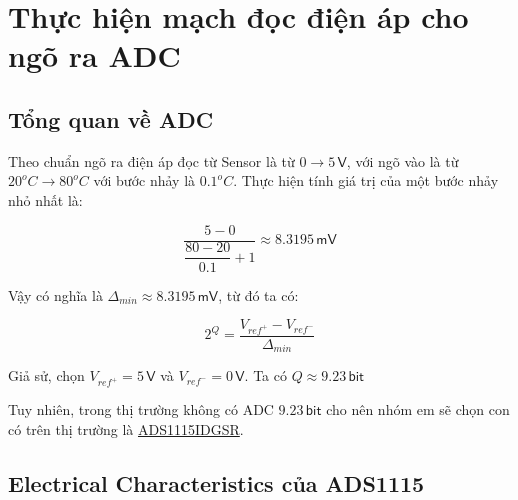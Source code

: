 \section{Thực hiện mạch đọc điện áp cho ngõ ra ADC}

\subsection{Tổng quan về ADC}

Theo chuẩn ngõ ra điện áp đọc từ Sensor là từ $0 \rightarrow 5\,\textsf{V}$, với ngõ vào là từ $20^{o}C \rightarrow 80^{o}C$ với bước nhảy là $0.1^{o}C$. Thực hiện tính giá trị của một bước nhảy nhỏ nhất là:

\[ \dfrac{5 - 0}{\dfrac{80 - 20}{0.1} + 1} \approx 8.3195 \,\textsf{mV} \]

Vậy có nghĩa là $\Delta_{min} \approx 8.3195 \,\textsf{mV} $, từ đó ta có:

\[ 2^{Q} = \dfrac{V_{ref^{+}} - V_{ref^{-}}}{\Delta_{min}} \]

Giả sử, chọn $V_{ref^{+}} = 5\,\textsf{V}$ và $V_{ref^{-}} = 0\,\textsf{V}$. Ta có $Q \approx 9.23\,\textsf{bit}$

Tuy nhiên, trong thị trường không có ADC $9.23\,\textsf{bit}$ cho nên nhóm em sẽ chọn con có trên thị trường là \href{https://www.ti.com/lit/ds/symlink/ads1115.pdf}{ADS1115IDGSR}.

\subsection{Electrical Characteristics của ADS1115}

